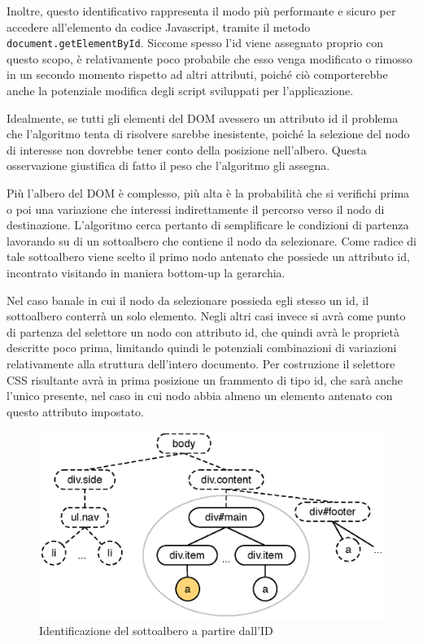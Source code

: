 Inoltre, questo identificativo rappresenta il modo più performante e sicuro per accedere all'elemento da codice Javascript, tramite il metodo \verb|document.getElementById|. Siccome spesso l'id viene assegnato proprio con questo scopo, è relativamente poco probabile che esso venga modificato o rimosso in un secondo momento rispetto ad altri attributi, poiché ciò comporterebbe anche la potenziale modifica degli script sviluppati per l'applicazione.

Idealmente, se tutti gli elementi del DOM avessero un attributo id il problema che l'algoritmo tenta di risolvere sarebbe inesistente, poiché la selezione del nodo di interesse non dovrebbe tener conto della posizione nell'albero. Questa osservazione giustifica di fatto il peso che l'algoritmo gli assegna. 

Più l'albero del DOM è complesso, più alta è la probabilità che si verifichi prima o poi una variazione che interessi indirettamente il percorso verso il nodo di destinazione. L'algoritmo cerca pertanto di semplificare le condizioni di partenza lavorando su di un sottoalbero che contiene il nodo da selezionare. Come radice di tale sottoalbero viene scelto il primo nodo antenato che possiede un attributo id, incontrato visitando in maniera bottom-up la gerarchia. 

Nel caso banale in cui il nodo da selezionare possieda egli stesso un id, il sottoalbero conterrà un solo elemento. Negli altri casi invece si avrà come punto di partenza del selettore un nodo con attributo id, che quindi avrà le proprietà descritte poco prima, limitando quindi le potenziali combinazioni di variazioni relativamente alla struttura dell'intero documento. Per costruzione il selettore CSS risultante avrà in prima posizione un frammento di tipo id, che sarà anche l'unico presente, nel caso in cui nodo abbia almeno un elemento antenato con questo attributo impostato. 

\begin{figure}[htbp]
\begin{center}
\includegraphics{images/id_partition.eps}
\caption{Identificazione del sottoalbero a partire dall'ID}
\label{fig:idPartition}
\end{center}
\end{figure}

